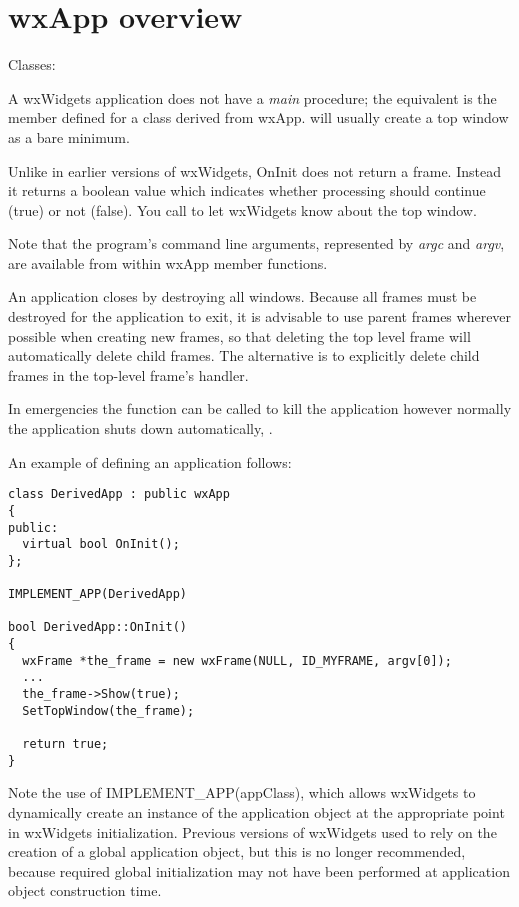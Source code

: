 \section{wxApp overview}\label{wxappoverview}

Classes: 

A wxWidgets application does not have a {\it main} procedure; the equivalent is the
\rtfsp{} member defined for a class derived from wxApp.\rtfsp
{} will usually create a top window as a bare minimum.

Unlike in earlier versions of wxWidgets, OnInit does not return a frame. Instead it
returns a boolean value which indicates whether processing should continue (true) or not (false).
You call  to let wxWidgets know
about the top window.

Note that the program's command line arguments, represented by {\it argc} 
and {\it argv}, are available from within wxApp member functions.

An application closes by destroying all windows. Because all frames must
be destroyed for the application to exit, it is advisable to use parent
frames wherever possible when creating new frames, so that deleting the
top level frame will automatically delete child frames. The alternative
is to explicitly delete child frames in the top-level frame's \rtfsp
handler.

In emergencies the  function can be called to kill the
application however normally the application shuts down automatically, 
.

An example of defining an application follows:

\begin{verbatim}
class DerivedApp : public wxApp
{
public:
  virtual bool OnInit();
};

IMPLEMENT_APP(DerivedApp)

bool DerivedApp::OnInit()
{
  wxFrame *the_frame = new wxFrame(NULL, ID_MYFRAME, argv[0]);
  ...
  the_frame->Show(true);
  SetTopWindow(the_frame);

  return true;
}
\end{verbatim}

Note the use of IMPLEMENT\_APP(appClass), which allows wxWidgets to dynamically create an instance of the application object
at the appropriate point in wxWidgets initialization. Previous versions of wxWidgets used
to rely on the creation of a global application object, but this is no longer recommended,
because required global initialization may not have been performed at application object
construction time.

